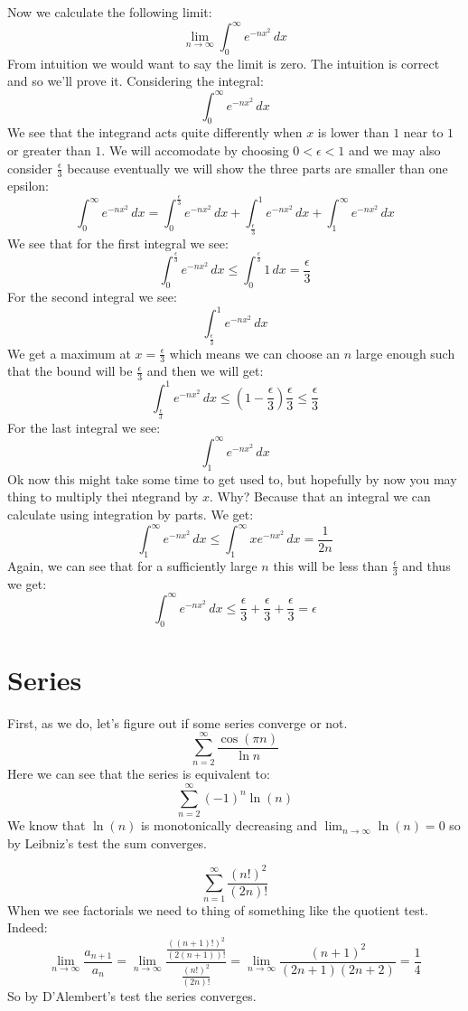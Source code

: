 \documentclass{article}
\theoremstyle{plain}
\begin{document}
	Now we calculate the following limit:
	\[
		\lim_{n\to\infty}{\int_{0}^{\infty}{e^{-nx^2}\,dx}}
	\]
	From intuition we would want to say the limit is zero. The intuition
	is correct and so we'll prove it. Considering the integral:
	\[
		\int_{0}^{\infty}{e^{-nx^2}\,dx}
	\]
	We see that the integrand acts quite differently when $x$ is lower than
	$1$ near to $1$ or greater than $1$. We will accomodate by choosing
	$0 < \epsilon < 1$ and we may also consider $\frac{\epsilon}{3}$ because
	eventually we will show the three parts are smaller than one epsilon:
	\[
		\int_{0}^{\infty}{e^{-nx^2}\,dx} = 
		\int_{0}^{\frac{\epsilon}{3}}{e^{-nx^2}\,dx} + 
		\int_{\frac{\epsilon}{3}}^{1}{e^{-nx^2}\,dx} + 
		\int_{1}^{\infty}{e^{-nx^2}\,dx}
	\]
	We see that for the first integral we see:
	\[
		\int_{0}^{\frac{\epsilon}{3}}{e^{-nx^2}\,dx} \le 
		\int_{0}^{\frac{\epsilon}{3}}{1\,dx} = \frac{\epsilon}{3}
	\]
	For the second integral we see:
	\[
		\int_{\frac{\epsilon}{3}}^{1}{e^{-nx^2}\,dx}
	\]
	We get a maximum at $x = \frac{\epsilon}{3}$ which means we can choose
	an $n$ large enough such that the bound will be $\frac{\epsilon}{3}$
	and then we will get:
	\[
		\int_{\frac{\epsilon}{3}}^{1}{e^{-nx^2}\,dx} \le 
		\left(1 - \frac{\epsilon}{3}\right)\frac{\epsilon}{3} \le 
		\frac{\epsilon}{3}
	\]
	For the last integral we see:
	\[
		\int_{1}^{\infty}{e^{-nx^2}\,dx}
	\]
	Ok now this might take some time to get used to, but hopefully by now
	you may thing to multiply thei ntegrand by $x$. Why? Because that
	an integral we can calculate using integration by parts. We get:
	\[
		\int_{1}^{\infty}{e^{-nx^2}\,dx} \le
		\int_{1}^{\infty}{xe^{-nx^2}\,dx} = \frac{1}{2n}
	\]
	Again, we can see that for a sufficiently large $n$ this will be less
	than $\frac{\epsilon}{3}$ and thus we get:
	\[
		\int_{0}^{\infty}{e^{-nx^2}\,dx} \le 
		\frac{\epsilon}{3} + \frac{\epsilon}{3} + \frac{\epsilon}{3} =
		\epsilon
	\]
	
	\newpage
	
	\section{Series}
	First, as we do, let's figure out if some series converge or not.
	\[
		\sum_{n=2}^{\infty}{\frac{\cos(\pi n)}{\ln n}}
	\]
	Here we can see that the series is equivalent to:
	\[
		\sum_{n=2}^{\infty}{(-1)^n\ln(n)}
	\]
	We know that $\ln(n)$ is monotonically decreasing and 
	$\lim_{n\to\infty}{\ln(n)} = 0$ so by Leibniz's test
	the sum converges.
	
	\newpage
	\[
		\sum_{n=1}^{\infty}{\frac{(n!)^2}{(2n)!}}
	\]
	When we see factorials we need to thing of something like the quotient
	test. Indeed:
	\[
		\lim_{n\to\infty}{\frac{a_{n+1}}{a_{n}}} = 
		\lim_{n\to\infty}{\frac{\frac{((n+1)!)^2}{(2(n+1))!}}{\frac{(n!)^2}
		{(2n)!}}} = 
		\lim_{n\to\infty}{\frac{(n+1)^2}{(2n+1)(2n+2)}} = 
		\frac{1}{4}
	\]
	So by D'Alembert's test the series converges.
	
\end{document}

